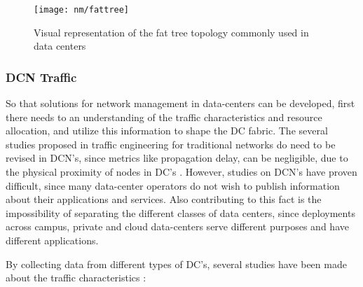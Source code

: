 \begin{figure} [!htbp]
    \centering
    \texttt{[image: nm/fattree]}
    \caption{Visual representation of the fat tree topology commonly used in data centers}
    \label{fig:fattree}
\end{figure}

\subsubsection {DCN Traffic}

\par So that solutions for network management in data-centers can be developed, first there needs to an understanding of the traffic characteristics and resource allocation, and utilize this information to shape the DC fabric.
The several studies proposed in traffic engineering for traditional networks do need to be revised in DCN's, since metrics like propagation delay, can be negligible, due to the physical proximity of nodes in DC's 
\cite{CITE - data_center_virt_survey}. However, studies on DCN's have proven difficult, since many data-center operators do not wish to publish information about their applications and services. Also contributing to this fact is
the impossibility of separating the different classes of data centers, since deployments across campus, private and cloud data-centers serve different purposes and have different applications.
\par By collecting data from different types of DC's, several studies have been made about the traffic characteristics \cite{ CITE - dc_networks_chars, CITE - dc_traffic_chars, CITE - fb_datacenter}:

